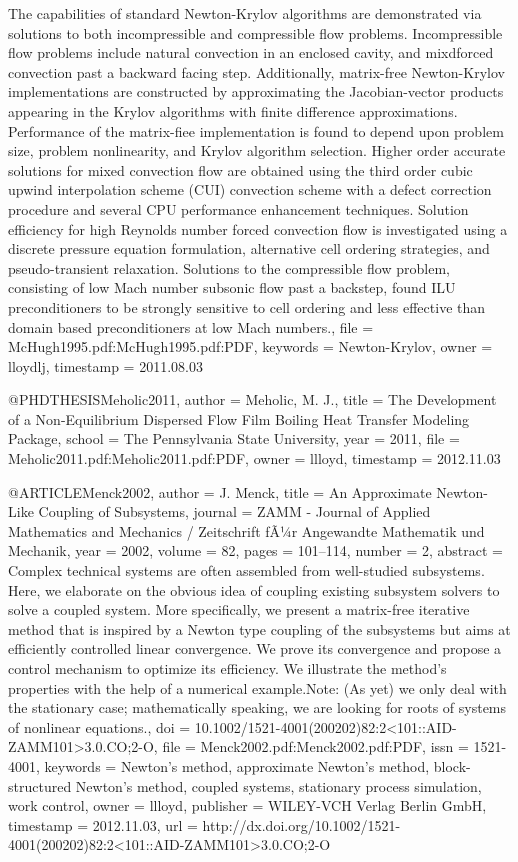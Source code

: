 {{{	
	The capabilities of standard Newton-Krylov algorithms are demonstrated
	via solutions to both incompressible and compressible flow problems.
	Incompressible flow problems include natural convection in an enclosed
	cavity, and mixdforced convection past a backward facing step. Additionally,
	matrix-free Newton-Krylov implementations are constructed by approximating
	the Jacobian-vector products appearing in the Krylov algorithms with
	finite difference approximations. Performance of the matrix-fiee
	implementation is found to depend upon problem size, problem nonlinearity,
	and Krylov algorithm selection. Higher order accurate solutions for
	mixed convection flow are obtained using the third order cubic upwind
	interpolation scheme (CUI) convection scheme with a defect correction
	procedure and several CPU performance enhancement techniques. Solution
	efficiency for high Reynolds number forced convection flow is investigated
	using a discrete pressure equation formulation, alternative cell
	ordering strategies, and pseudo-transient relaxation. Solutions to
	the compressible flow problem, consisting of low Mach number subsonic
	flow past a backstep, found ILU preconditioners to be strongly sensitive
	to cell ordering and less effective than domain based preconditioners
	at low Mach numbers.},
  file = {McHugh1995.pdf:McHugh1995.pdf:PDF},
  keywords = {Newton-Krylov},
  owner = {lloydlj},
  timestamp = {2011.08.03}
}

@PHDTHESIS{Meholic2011,
  author = {Meholic, M. J.},
  title = {The Development of a Non-Equilibrium Dispersed Flow Film Boiling
	Heat Transfer Modeling Package},
  school = {The Pennsylvania State University},
  year = {2011},
  file = {Meholic2011.pdf:Meholic2011.pdf:PDF},
  owner = {llloyd},
  timestamp = {2012.11.03}
}

@ARTICLE{Menck2002,
  author = {J. Menck},
  title = {An Approximate Newton-Like Coupling of Subsystems},
  journal = {ZAMM - Journal of Applied Mathematics and Mechanics / Zeitschrift
	fÃ¼r Angewandte Mathematik und Mechanik},
  year = {2002},
  volume = {82},
  pages = {101--114},
  number = {2},
  abstract = {Complex technical systems are often assembled from well-studied subsystems.
	Here, we elaborate on the obvious idea of coupling existing subsystem
	solvers to solve a coupled system. More specifically, we present
	a matrix-free iterative method that is inspired by a Newton type
	coupling of the subsystems but aims at efficiently controlled linear
	convergence. We prove its convergence and propose a control mechanism
	to optimize its efficiency. We illustrate the method's properties
	with the help of a numerical example.Note: (As yet) we only deal
	with the stationary case; mathematically speaking, we are looking
	for roots of systems of nonlinear equations.},
  doi = {10.1002/1521-4001(200202)82:2<101::AID-ZAMM101>3.0.CO;2-O},
  file = {Menck2002.pdf:Menck2002.pdf:PDF},
  issn = {1521-4001},
  keywords = {Newton's method, approximate Newton's method, block-structured Newton's
	method, coupled systems, stationary process simulation, work control},
  owner = {llloyd},
  publisher = {WILEY-VCH Verlag Berlin GmbH},
  timestamp = {2012.11.03},
  url = {http://dx.doi.org/10.1002/1521-4001(200202)82:2<101::AID-ZAMM101>3.0.CO;2-O}
}

}
